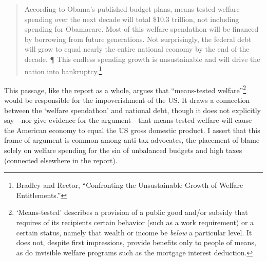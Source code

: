 \documentclass[
]{article}
\begin{document}
\begin{quote}
According to Obama's published budget plans, means-tested welfare spending over the next decade will total \$10.3 trillion, not including spending for Obamacare. Most of this welfare spendathon will be financed by borrowing from future generations. Not surprisingly, the federal debt will grow to equal nearly the entire national economy by the end of the decade. ¶ This endless spending growth is unsustainable and will drive the nation into bankruptcy.\footnote{Bradley and Rector, ``Confronting the Unsustainable Growth of Welfare Entitlements.''}
\end{quote}

This passage, like the report as a whole, argues that ``means-tested welfare''\footnote{`Means-tested' describes a provision of a public good and/or subsidy that requires of its recipients certain behavior (such as a work requirement) or a certain status, namely that wealth or income be \emph{below} a particular level. It does not, despite first impressions, provide benefits only to people of means, as do invisible welfare programs such as the mortgage interest deduction.} would be responsible for the impoverishment of the US.
It draws a connection between the `welfare spendathon' and national debt, though it does not explicitly say---nor give evidence for the argument---that means-tested welfare will cause the American economy to equal the US gross domestic product.
I assert that this frame of argument is common among anti-tax advocates, the placement of blame solely on welfare spending for the sin of unbalanced budgets and high taxes (connected elsewhere in the report).
\end{document}
